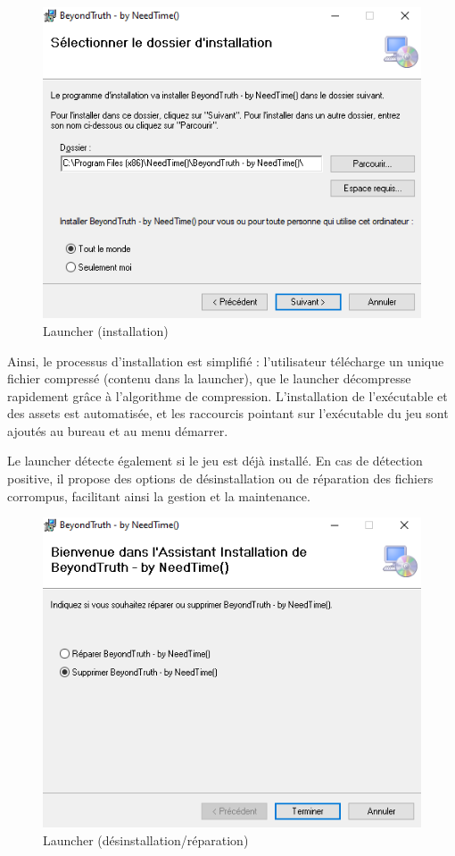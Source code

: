 \documentclass[
	article,			%
	11pt,				%
	oneside,			%
	a4paper,			%
	chapter=TITLE,
	french,			%
	sumario=tradicional
	]{base_nt}
\begin{document}
\begin{figure}[ht]
	\caption{Launcher (installation)}
	\centering
	\includegraphics[width=1\linewidth]{paper10.png}
	\legend{}
	
\end{figure}

Ainsi, le processus d'installation est simplifié : l'utilisateur télécharge un unique fichier compressé (contenu dans la launcher), que le launcher décompresse rapidement grâce à l'algorithme de compression. L'installation de l'exécutable et des assets est automatisée, et les raccourcis pointant sur l'exécutable du jeu sont ajoutés au bureau et au menu démarrer.

\newpage

Le launcher détecte également si le jeu est déjà installé. En cas de détection positive, il propose des options de désinstallation ou de réparation des fichiers corrompus, facilitant ainsi la gestion et la maintenance.

\begin{figure}[ht]
	\caption{Launcher (désinstallation/réparation)}
	\centering
	\includegraphics[width=1\linewidth]{paper11.png}
	\legend{}
	
\end{figure}
\end{document}

